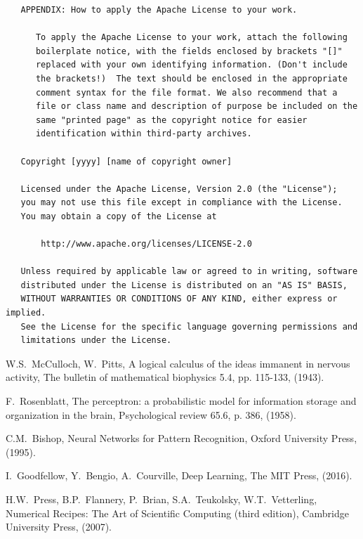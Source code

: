 \documentclass{book}
\begin{document}
\begin{verbatim}
   APPENDIX: How to apply the Apache License to your work.

      To apply the Apache License to your work, attach the following
      boilerplate notice, with the fields enclosed by brackets "[]"
      replaced with your own identifying information. (Don't include
      the brackets!)  The text should be enclosed in the appropriate
      comment syntax for the file format. We also recommend that a
      file or class name and description of purpose be included on the
      same "printed page" as the copyright notice for easier
      identification within third-party archives.

   Copyright [yyyy] [name of copyright owner]

   Licensed under the Apache License, Version 2.0 (the "License");
   you may not use this file except in compliance with the License.
   You may obtain a copy of the License at

       http://www.apache.org/licenses/LICENSE-2.0

   Unless required by applicable law or agreed to in writing, software
   distributed under the License is distributed on an "AS IS" BASIS,
   WITHOUT WARRANTIES OR CONDITIONS OF ANY KIND, either express or implied.
   See the License for the specific language governing permissions and
   limitations under the License.

\end{verbatim}

\begin{thebibliography}{1}

W.S.~McCulloch, W.~Pitts,
A logical calculus of the ideas immanent in nervous activity,
The bulletin of mathematical biophysics 5.4, pp. 115-133, (1943).

F.~Rosenblatt,
The perceptron: a probabilistic model for information storage and organization in the brain,
Psychological review 65.6, p. 386, (1958).

C.M.~Bishop,
Neural Networks for Pattern Recognition,
Oxford University Press, (1995).

I.~Goodfellow, Y.~Bengio, A.~Courville,
Deep Learning, The MIT Press, (2016).

H.W.~Press, B.P.~Flannery, P.~Brian, S.A.~Teukolsky, W.T.~Vetterling,
Numerical Recipes: The Art of Scientific Computing (third edition),
Cambridge University Press, (2007).


\end{thebibliography}
\end{document}
